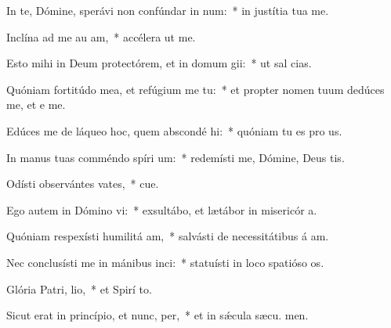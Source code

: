 \item In te, Dómine, sperávi non confúndar in num:~* in justítia tua  me.
\item Inclína ad me au am,~* accélera ut  me.
\item Esto mihi in Deum protectórem, et in domum gii:~* ut sal  cias.
\item Quóniam fortitúdo mea, et refúgium me  tu:~* et propter nomen tuum dedúces me, et e me.
\item Edúces me de láqueo hoc, quem abscondé hi:~* quóniam tu es pro us.
\item In manus tuas comméndo spíri um:~* redemísti me, Dómine, Deus tis.
\item Odísti observántes vates,~* cue.
\item Ego autem in Dómino vi:~* exsultábo, et lætábor in misericór a.
\item Quóniam respexísti humilitá am,~* salvásti de necessitátibus á am.
\item Nec conclusísti me in mánibus inci:~* statuísti in loco spatióso  os.
\item Glória Patri,  lio,~* et Spirí to.
\item Sicut erat in princípio, et nunc,  per,~* et in sǽcula sæcu. men.

